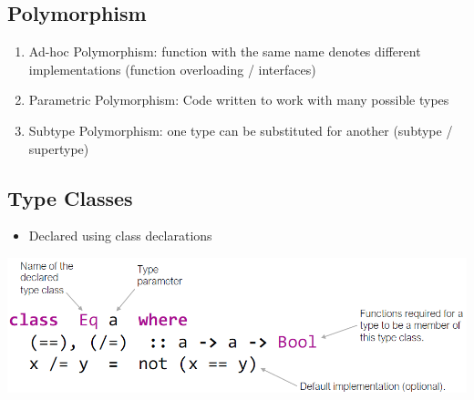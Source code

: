 \subsection{Polymorphism}
\begin{enumerate}
    \item Ad-hoc Polymorphism: function with the same name denotes different implementations (function overloading / interfaces)
    \item Parametric Polymorphism: Code written to work with many possible types
    \item Subtype Polymorphism: one type can be substituted for another (subtype / supertype)
\end{enumerate}

\subsection{Type Classes}
\begin{itemize}
    \item Declared using class declarations
\end{itemize}
\includegraphics[width=0.7\linewidth]{../img/class_declarations.png}